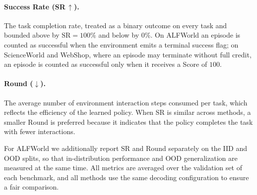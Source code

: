 \documentclass[11pt]{article}
\begin{document}
\paragraph{Success Rate (SR\,$\uparrow$).}
The task completion rate, treated as a binary outcome on every task and bounded above by $\mathrm{SR}=100\%$ and below by $0\%$. 
On ALFWorld an episode is counted as successful when the environment emits a terminal success flag; 
on ScienceWorld and WebShop, where an episode may terminate without full credit, an episode is counted as successful only when it receives a Score of $100$.

\paragraph{Round ($\downarrow$).}
The average number of environment interaction steps consumed per task, which reflects the efficiency of the learned policy. 
When SR is similar across methods, a smaller Round is preferred because it indicates that the policy completes the task with fewer interactions.

For ALFWorld we additionally report SR and Round separately on the IID and OOD splits, so that in-distribution performance and OOD generalization are measured at the same time. 
All metrics are averaged over the validation set of each benchmark, and all methods use the same decoding configuration to ensure a fair comparison.
\end{document}
